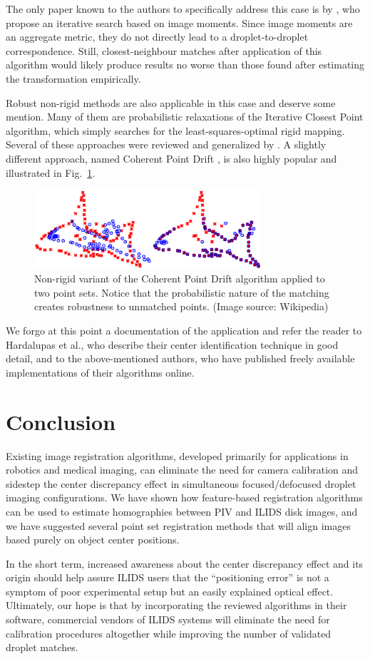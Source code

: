 \documentclass[preprint]{elsarticle}
\begin{document}
The only paper known to the authors to specifically address this case is by
 \citet{Chi11}, who propose an iterative search based on image moments. Since
image moments are an aggregate metric, they do not directly lead to a
droplet-to-droplet correspondence. Still, closest-neighbour matches after
application of this algorithm would likely produce results no worse than those
found after estimating the transformation empirically.

Robust non-rigid methods are also applicable in this case and deserve some
mention. Many of them are probabilistic relaxations of the Iterative Closest
Point algorithm, which simply searches for the least-squares-optimal rigid
mapping. Several of these approaches were reviewed and generalized by
\citet{Jian10}. A slightly different approach, named Coherent Point
Drift \cite{Myronenko10}, is also highly popular and illustrated in Fig.~\ref{fig:cpd}.
\begin{figure}
    \centering
    \includegraphics[width=0.75\textwidth]{orb_images/pointset.eps}
    \caption{Non-rigid variant of the Coherent Point Drift algorithm applied to
    two point sets. Notice that the probabilistic nature of the matching creates
robustness to unmatched points. (Image source: Wikipedia)}
    \label{fig:cpd}
\end{figure}

We forgo at this point a documentation of the application and refer the reader to
Hardalupas et al., who describe their center identification technique in
good detail, and to the above-mentioned authors, who have published freely
available implementations of their algorithms online.

\section{Conclusion}
Existing image registration algorithms, developed primarily for applications in
robotics and medical imaging, can eliminate the need for camera calibration and
sidestep the center discrepancy effect in simultaneous focused/defocused droplet imaging
configurations. We have shown how feature-based registration algorithms can be
used to estimate homographies between PIV and ILIDS disk images, and we have
suggested several point set registration methods that will align images based
purely on object center positions.

In the short term, increased awareness about the center discrepancy effect and
its origin should help assure ILIDS users that the ``positioning error'' is not a
symptom of poor experimental setup but an easily explained optical effect.
Ultimately, our hope is that by incorporating the reviewed algorithms in their
software, commercial vendors of ILIDS systems will eliminate the need for
calibration procedures altogether while improving the number of validated
droplet matches.


\end{document}
